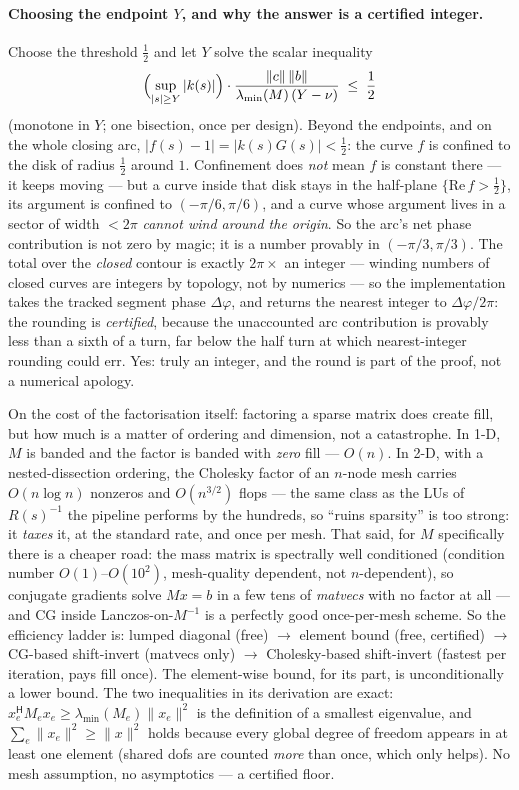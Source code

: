 \documentclass[11pt,a4paper]{article}
\newcommand{\hp}{^{\mathsf H}}
\begin{document}
{\paragraph{Choosing the endpoint $Y$, and why the answer is a certified integer.}
Choose the threshold $\tfrac12$ and let $Y$ solve the scalar inequality
\[
\Bigl(\sup_{|s|\ge Y}|k(s)|\Bigr)\cdot
\frac{\|c\|\,\|b\|}{\lambda_{\min}(M)\,(Y-\nu)}\;\le\;\frac12
\]
(monotone in $Y$; one bisection, once per design).  Beyond the endpoints, and on the whole
closing arc, $|f(s)-1|=|k(s)G(s)|<\tfrac12$: the curve $f$ is confined to the disk of
radius $\tfrac12$ around $1$.  Confinement does \emph{not} mean $f$ is constant there ---
it keeps moving --- but a curve inside that disk stays in the half-plane
$\{\mathrm{Re}\,f>\tfrac12\}$, its argument is confined to $(-\pi/6,\pi/6)$, and a curve
whose argument lives in a sector of width $<2\pi$ \emph{cannot wind around the origin}.
So the arc's net phase contribution is not zero by magic; it is a number provably in
$(-\pi/3,\pi/3)$.  The total over the \emph{closed} contour is exactly $2\pi\times$ an
integer --- winding numbers of closed curves are integers by topology, not by numerics ---
so the implementation takes the tracked segment phase $\Delta\varphi$, and returns the
nearest integer to $\Delta\varphi/2\pi$: the rounding is \emph{certified}, because the
unaccounted arc contribution is provably less than a sixth of a turn, far below the half
turn at which nearest-integer rounding could err.  Yes: truly an integer, and the round
is part of the proof, not a numerical apology.





On the cost of the factorisation itself: factoring a sparse matrix does create fill, but how
much is a matter of ordering and dimension, not a catastrophe.  In 1-D, $M$ is banded and
the factor is banded with \emph{zero} fill --- $O(n)$.  In 2-D, with a nested-dissection
ordering, the Cholesky factor of an $n$-node mesh carries $O(n\log n)$ nonzeros and
$O(n^{3/2})$ flops --- the same class as the LUs of $R(s)^{-1}$ the pipeline performs by
the hundreds, so ``ruins sparsity'' is too strong: it \emph{taxes} it, at the standard
rate, and once per mesh.  That said, for $M$ specifically there is a cheaper road: the
mass matrix is spectrally well conditioned (condition number $O(1)$--$O(10^2)$,
mesh-quality dependent, not $n$-dependent), so conjugate gradients solve $Mx=b$ in a few
tens of \emph{matvecs} with no factor at all --- and CG inside Lanczos-on-$M^{-1}$ is a
perfectly good once-per-mesh scheme.  So the efficiency ladder is: lumped diagonal
(free) $\to$ element bound (free, certified) $\to$ CG-based shift-invert (matvecs only)
$\to$ Cholesky-based shift-invert (fastest per iteration, pays fill once).
The element-wise bound, for its part, is unconditionally a lower bound.  The two inequalities in its
derivation are exact: $x_e\hp M_ex_e\ge\lambda_{\min}(M_e)\|x_e\|^2$ is the definition of
a smallest eigenvalue, and $\sum_e\|x_e\|^2\ge\|x\|^2$ holds because every global degree
of freedom appears in at least one element (shared dofs are counted \emph{more} than
once, which only helps).  No mesh assumption, no asymptotics --- a certified floor.

}
\end{document}
